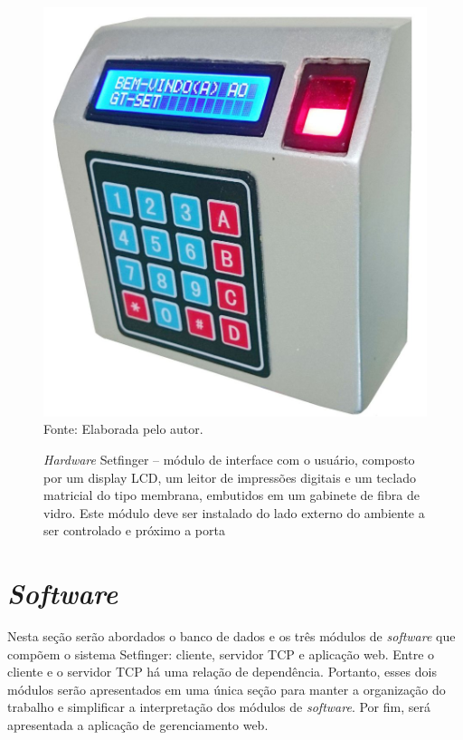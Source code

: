 \begin{figure}[!t]
  \begin{center}
  \caption{\textit{Hardware} Setfinger -- módulo de interface com o usuário, composto por um display LCD, um leitor de impressões digitais e um teclado matricial do tipo membrana, embutidos em um gabinete de fibra de vidro. Este módulo deve ser instalado do lado externo do ambiente a ser controlado e próximo a porta}
  \includegraphics[scale=0.2]{figuras/cap4/setfinger_final.jpg}\\
  Fonte: Elaborada pelo autor.
  \label{setfinger_final}
  \end{center}
  \end{figure}





\section{\textit{Software} \label{software}}

Nesta seção serão abordados o banco de dados e os três módulos de \textit{software} que compõem o sistema Setfinger: cliente, servidor TCP e aplicação web. Entre o cliente e o servidor TCP há uma relação de dependência. Portanto, esses dois módulos serão apresentados em uma única seção para manter a organização do trabalho e simplificar a interpretação dos módulos  de \textit{software}. Por fim, será apresentada a aplicação de gerenciamento web.



